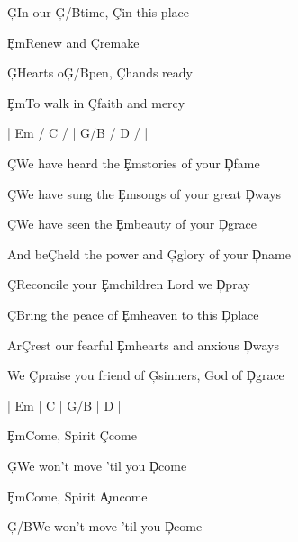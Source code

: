 \documentclass[9pt]{extarticle}
\begin{document}
\bsong

\bc
\c{G}In our \c{G/B}time, \c{C}in this place

\c{Em}Renew and \c{C}remake

\c{G}Hearts o\c{G/B}pen, \c{C}hands ready

\c{Em}To walk in \c{C}faith and mercy
\ec

\bin
|  Em / C /  |  G/B / D /  |
\ein

\bv
\c{C}We have heard the \c{Em}stories of your \c{D}fame

\c{C}We have sung the \c{Em}songs of your great \c{D}ways

\c{C}We have seen the \c{Em}beauty of your \c{D}grace

And be\c{C}held the power and \c{G}glory of your \c{D}name
\ev



\bv
\c{C}Reconcile your \c{Em}children Lord we \c{D}pray

\c{C}Bring the peace of \c{Em}heaven to this \c{D}place

Ar\c{C}rest our fearful \c{Em}hearts and anxious \c{D}ways

We \c{C}praise you friend of \c{G}sinners, God of \c{D}grace
\ev


\bin
| Em | C |  G/B  | D |
\ein

\bb[3]
\c{Em}Come, Spirit \c{C}come

\c{G}We won't move 'til you \c{D}come
\eb

\bb
\c{Em}Come, Spirit \c{Am}come

\c{G/B}We won't move 'til you \c{D}come
\eb


\esong
\end{document}
